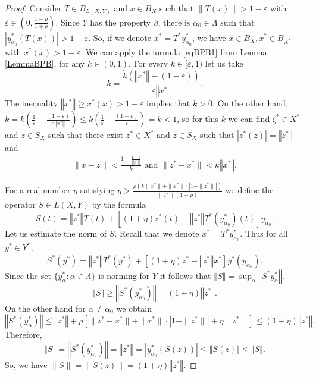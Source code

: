 \documentclass[11pt,a4paper]{amsart}
\newcommand{\eps}{\varepsilon}
\newcommand{\norm}[1]{\left\Vert#1\right\Vert}
\numberwithin{equation}{section}
\theoremstyle{plain}
\theoremstyle{definition}
\renewcommand{\leq}{\leqslant}
\renewcommand{\geq}{\geqslant}
\renewcommand{\le}{\leqslant}
\renewcommand{\ge}{\geqslant}
\begin{document}
\begin{proof}
Consider $T\in B_{L(X,Y)}$ and $x\in B_X$ such that $\|T(x)\|> 1-\eps$ with $\eps\in\left(0, \frac{1-\rho}{1+\rho}\right)$.
Since $Y$ has the property $\beta$, there is $\alpha_0\in \Lambda$ such that $|y^*_{\alpha_0}(T(x))|> 1-\eps$.
So, if we denote $x^*=T^*y^*_{\alpha_0}$, we have $x\in B_X, x^*\in B_{X^*}$ with $x^*(x)>1-\eps$. We can apply the  formula \eqref{eqBPB1} from Lemma \ref{LemmaBPB}, for
any  $k \in (0, 1)$. For every $\tilde{k}\in [\eps, 1)$ let us take 
$$k=\frac{ \tilde{k} (\norm{x^*} - (1-\eps))}{\eps \norm{x^*}}.$$
The inequality $\norm{x^*} \ge x^*(x) > 1-\eps$ implies that $k > 0$. On the other hand, $k=\tilde{k}\left(\frac{1}{\eps} - \frac{(1-\eps)}{\eps  \norm{x^*}}\right)\le \tilde{k}\left(\frac{1}{\eps} - \frac{(1-\eps)}{\eps}\right) = \tilde{k} < 1$, so for this $k$ we can find  $\zeta^*\in X^*$ and $z\in S_X$  such that 
there exist $z^*\in X^*$ and $z\in S_X$ such that $|z^*(z)|=\norm{z^*}$ and 
\begin{align*}
\|x-z\|< \frac{1-\frac{1-\eps}{\norm{x^*}}}{k} \,\,\text{and}\,\,\|z^*-x^*\|<k\norm{x^*}.
\end{align*}

For a real number $\eta$ satisfying $\eta> \frac{\rho(k\|x^*\|+\|x^*\|\cdot|1-\|z^*\||)}{\|z^*\|(1-\rho)}$ we define the operator $S\in L(X,Y)$ by the formula
$$S(t) = \norm{z^*} T(t)+[(1+\eta)z^*(t)-\norm{z^*} T^*(y^*_{\alpha_0})(t)]y_{\alpha_0}.$$
 Let us estimate the norm of $S$. Recall that we denote $x^*=T^*y^*_{\alpha_0}$. Thus for all $y^*\in Y^*$,
$$
S^*(y^*) = \norm{z^*}T^*(y^*)+[(1+\eta)z^* -\norm{z^*} x^*]y^*(y_{\alpha_0}).
$$
Since the set $\{y^*_{\alpha}: \alpha \in \Lambda\}$ is norming for $Y$ it follows that $\norm{S} = \sup_\alpha \norm{S^*{y^*_{\alpha}}}$.
$$\norm{S} \geq \norm{S^*(y^*_{\alpha_0})} = (1+\eta)\norm{z^*}.$$
On the other hand for $\alpha \neq \alpha_0$ we obtain
$$\norm{S^*(y^*_{\alpha})}\leq \norm{z^*} +\rho[\|z^*-x^*\|+\|x^*\|\cdot |1-\|z^*\|| + \eta\|z^*\|]\leq(1+\eta)\norm{z^*}.$$
Therefore, 
$$\norm{S} = \norm{S^*(y^*_{\alpha_0})} = \norm{z^*}=|y^*_{\alpha_0}(S(z))|\leq \norm{S(z)}\leq\norm{S}.
$$
So, we have $\|S\|=\|S(z)\|=(1+\eta)\norm{z^*}$.


\end{proof}
\end{document}
